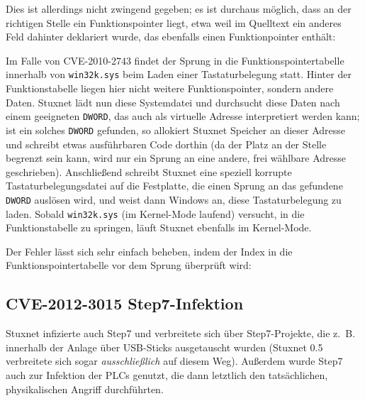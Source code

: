 \documentclass[a4paper]{article}
\begin{document}


Dies ist allerdings nicht zwingend gegeben; es ist durchaus möglich, dass an der richtigen Stelle ein Funktionspointer liegt,
etwa weil im Quelltext ein anderes Feld dahinter deklariert wurde, das ebenfalls einen Funktionpointer enthält:



Im Falle von CVE-2010-2743 findet der Sprung in die Funktionspointertabelle innerhalb von \texttt{win32k.sys} beim Laden einer Tastaturbelegung statt.
Hinter der Funktionstabelle liegen hier nicht weitere Funktionspointer, sondern andere Daten.
Stuxnet lädt nun diese Systemdatei und durchsucht diese Daten nach einem geeigneten \texttt{DWORD}, das auch als virtuelle Adresse interpretiert werden kann;
ist ein solches \texttt{DWORD} gefunden, so allokiert Stuxnet Speicher an dieser Adresse und schreibt etwas ausführbaren Code dorthin
(da der Platz an der Stelle begrenzt sein kann, wird nur ein Sprung an eine andere, frei wählbare Adresse geschrieben).
Anschließend schreibt Stuxnet eine speziell korrupte Tastaturbelegungsdatei auf die Festplatte, die einen Sprung an das gefundene \texttt{DWORD} auslösen wird,
und weist dann Windows an, diese Tastaturbelegung zu laden.
Sobald \texttt{win32k.sys} (im Kernel-Mode laufend) versucht, in die Funktionstabelle zu springen,
läuft Stuxnet ebenfalls im Kernel-Mode.

Der Fehler lässt sich sehr einfach beheben, indem der Index in die Funktionspointertabelle vor dem Sprung überprüft wird:



\subsection{CVE-2012-3015 Step7-Infektion}

Stuxnet infizierte auch Step7 und verbreitete sich über Step7-Projekte,
die z.~B. innerhalb der Anlage über USB-Sticks ausgetauscht wurden
(Stuxnet 0.5 verbreitete sich sogar \emph{ausschließlich} auf diesem Weg).
Außerdem wurde Step7 auch zur Infektion der PLCs genutzt, die dann letztlich den tatsächlichen, physikalischen Angriff durchführten.
\end{document}
